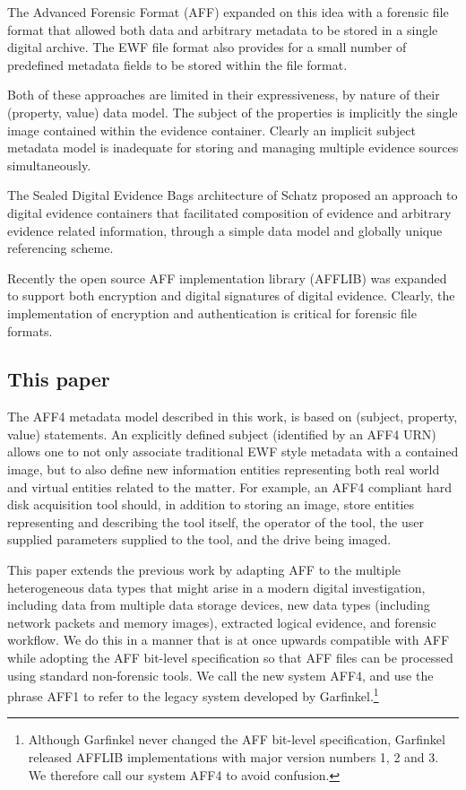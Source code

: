 \documentclass[10pt, conference]{IEEEtran}
\begin{document}
The Advanced Forensic Format (AFF) expanded on this idea with a
forensic file format that allowed both data and arbitrary metadata to
be stored in a single digital archive\cite{garfinkel:aff}. The EWF
file format also provides for a small number of predefined metadata
fields to be stored within the file format.

Both of these approaches are limited in their expressiveness, by
nature of their (property, value) data model. The subject of the
properties is implicitly the single image contained within the
evidence container. Clearly an implicit subject metadata model is
inadequate for storing and managing multiple evidence sources
simultaneously.

The Sealed Digital Evidence Bags architecture of Schatz proposed an
approach to digital evidence containers that facilitated composition
of evidence and arbitrary evidence related information, through a
simple data model and globally unique referencing
scheme\cite{schatz:sdeb}. 

Recently the open source AFF implementation library (AFFLIB) was
expanded to support both encryption and digital signatures of digital
evidence\cite{garfinkel:affcrypto}. Clearly, the implementation of
encryption and authentication is critical for forensic file formats.

\subsection{This paper}
The AFF4 metadata model described in this work, is based on (subject,
property, value) statements. An explicitly defined subject (identified
by an AFF4 URN) allows one to not only associate traditional EWF style
metadata with a contained image, but to also define new information
entities representing both real world and virtual entities related to
the matter. For example, an AFF4 compliant hard disk acquisition tool
should, in addition to storing an image, store entities representing
and describing the tool itself, the operator of the tool, the user
supplied parameters supplied to the tool, and the drive being imaged.

This paper extends the previous work by adapting AFF to the multiple
heterogeneous data types that might arise in a modern digital
investigation, including data from multiple data storage devices, new
data types (including network packets and memory images), extracted
logical evidence, and forensic workflow. We do this in a manner that
is at once upwards compatible with AFF while adopting the AFF
bit-level specification so that AFF files can be processed using
standard non-forensic tools.  We call the new system AFF4, and use the
phrase AFF1 to refer to the legacy system developed by
Garfinkel.\footnote{Although Garfinkel never changed the AFF bit-level
specification, Garfinkel released AFFLIB implementations with major
version numbers 1, 2 and 3. We therefore call our system AFF4 to avoid
confusion.}
\end{document}
